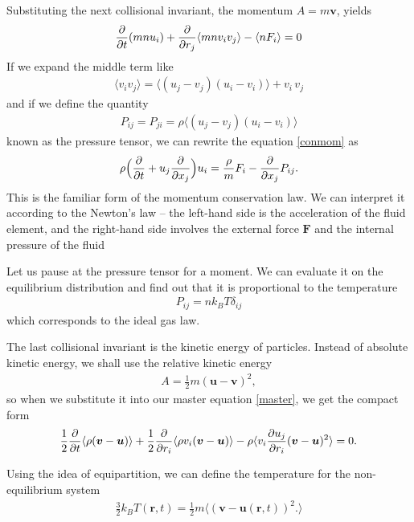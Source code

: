 Substituting the next collisional invariant, the momentum $A=m\bm{v}$, yields
\begin{align} \label{conmom}
\frac{\partial}{\partial t} (mn u_i)  + \frac{\partial}{\partial r_j}\langle mn v_i v_j \rangle - \langle n F_i \rangle = 0
\end{align}
If we expand the middle term like
\begin{align*}
\langle v_i v_j \rangle = \langle (u_j - v_j) (u_i - v_i) \rangle + v_i\, v_j
\end{align*}
and if we define the quantity
\begin{align*}
P_{ij} = P_{ji} = \rho \langle (u_j - v_j) (u_i - v_i) \rangle
\end{align*}
known as the pressure tensor,
we can rewrite the equation \ref{conmom} as
\begin{align*}
\rho \Big(\frac{\partial}{\partial t} + u_j \frac{\partial}{\partial x_j} \Big) u_i = \frac{\rho}{m} F_i - \frac{\partial}{\partial x_j}P_{ij}.
\end{align*}
This is the familiar form of the momentum conservation law. We can interpret it according to the Newton's law -- the left-hand side is the acceleration of the fluid element, and the right-hand side involves the external force $\bm{F}$ and the internal pressure of the fluid

Let us pause at the pressure tensor for a moment. We can evaluate it on the equilibrium distribution and find out that it is proportional to the temperature
\begin{align*}
P_{ij} = n k_B T \delta_{ij}
\end{align*} 
which corresponds to the ideal gas law.

\bigskip

The last collisional invariant is the kinetic energy of particles.
Instead of absolute kinetic energy, we shall use the relative kinetic energy
\begin{align*}
A  = \frac{1}{2} m (\bm{u} - \bm{v})^2,
\end{align*}
so when we substitute it into our master equation \ref{master}, we get the compact form
\begin{align} \label{cone}
\frac{1}{2} \frac{\partial}{\partial t} \langle \rho(\bm{v} - \bm{u}) \rangle + \frac{1}{2} \frac{\partial}{\partial r_i} \langle \rho v_i (\bm{v} - \bm{u}) \rangle - \rho \langle v_i \frac{\partial u_j}{\partial r_i}(\bm{v} - \bm{u})^2 \rangle = 0.
\end{align}

Using the idea of equipartition, we can define the temperature for the non-equilibrium system
\begin{align*}
\frac{3}{2}k_B T(\bm{r},t) = \frac{1}{2} m \langle (\bm{v} - \bm{u}(\bm{r},t))^2. \rangle
\end{align*}

